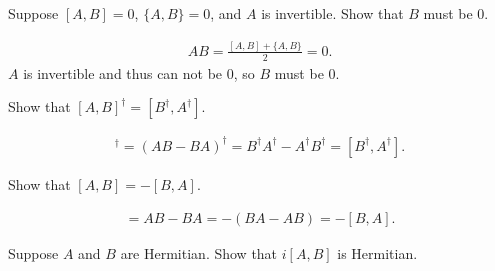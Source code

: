 \documentclass[en]{sol-man}
\begin{document}
\begin{exe}
    Suppose $[A,B]=0$, $\{A,B\}=0$, and $A$ is invertible. Show that $B$ must be 0.
\end{exe}
\begin{pf}
    \begin{align}
        AB=\frac{[A,B]+\{A,B\}}{2}=0.
    \end{align}
    $A$ is invertible and thus can not be $0$, so $B$ must be $0$.
\end{pf}

\begin{exe}
    Show that $[A,B]^{\dagger}=[B^{\dagger},A^{\dagger}]$.
\end{exe}
\begin{pf}
    \begin{align}
        [A,B]^{\dagger}=(AB-BA)^{\dagger}=B^{\dagger}A^{\dagger}-A^{\dagger}B^{\dagger}=[B^{\dagger},A^{\dagger}].
    \end{align}
\end{pf}

\begin{exe}
    Show that $[A,B]=-[B,A]$.
\end{exe}
\begin{pf}
    \begin{align}
        [A,B]=AB-BA=-(BA-AB)=-[B,A].
    \end{align}
\end{pf}

\begin{exe}
    Suppose $A$ and $B$ are Hermitian. Show that $i[A,B]$ is Hermitian.
\end{exe}
\begin{pf}
    
\end{pf}

\ifx\allfiles\undefined
\end{document}
